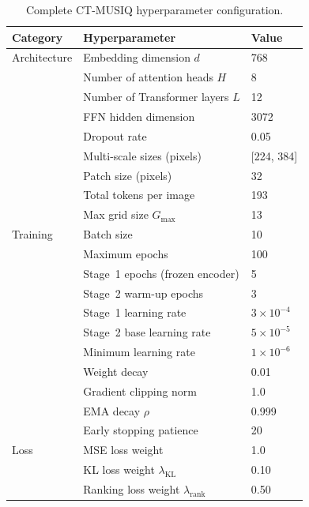 \begin{table}[h]
    \centering
    \caption{Complete CT-MUSIQ hyperparameter configuration.}
    \label{tab:hyperparams}
    \begin{tabular}{lll}
        \toprule
        \textbf{Category} & \textbf{Hyperparameter} & \textbf{Value} \\
        \midrule
        Architecture & Embedding dimension $d$ & 768 \\
                     & Number of attention heads $H$ & 8 \\
                     & Number of Transformer layers $L$ & 12 \\
                     & FFN hidden dimension & 3072 \\
                     & Dropout rate & 0.05 \\
                     & Multi-scale sizes (pixels) & [224, 384] \\
                     & Patch size (pixels) & 32 \\
                     & Total tokens per image & 193 \\
                     & Max grid size $G_{\max}$ & 13 \\
        \midrule
        Training     & Batch size & 10 \\
                     & Maximum epochs & 100 \\
                     & Stage~1 epochs (frozen encoder) & 5 \\
                     & Stage~2 warm-up epochs & 3 \\
                     & Stage~1 learning rate & $3 \times 10^{-4}$ \\
                     & Stage~2 base learning rate & $5 \times 10^{-5}$ \\
                     & Minimum learning rate & $1 \times 10^{-6}$ \\
                     & Weight decay & 0.01 \\
                     & Gradient clipping norm & 1.0 \\
                     & EMA decay $\rho$ & 0.999 \\
                     & Early stopping patience & 20 \\
        \midrule
        Loss         & MSE loss weight & 1.0 \\
                     & KL loss weight $\lambda_{\text{KL}}$ & 0.10 \\
                     & Ranking loss weight $\lambda_{\text{rank}}$ & 0.50 \\

\end{tabular}
\end{table}
